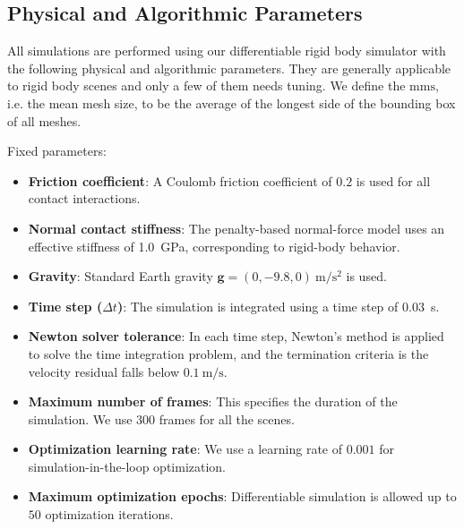 \subsection{Physical and Algorithmic Parameters}
All simulations are performed using our differentiable rigid body simulator with the following physical and algorithmic parameters. They are generally applicable to rigid body scenes and only a few of them needs tuning. We define the $\mathrm{mms}$, i.e. the mean mesh size, to be the average of the longest side of the bounding box of all meshes.

Fixed parameters:
\begin{itemize}

    \item \textbf{Friction coefficient}:  
    A Coulomb friction coefficient of $0.2$ is used for all contact interactions.

    \item \textbf{Normal contact stiffness}:  
    The penalty-based normal-force model uses an effective stiffness of 
    \SI{1.0}{\giga\pascal}, corresponding to rigid-body behavior.


    \item \textbf{Gravity}:  
    Standard Earth gravity $\mathbf{g} = (0, -9.8, 0)\ \si{\meter\per\second\squared}$ is used.

    \item \textbf{Time step ($\Delta t$)}:  
    The simulation is integrated using a time step of \SI{0.03}{\second}.


    \item \textbf{Newton solver tolerance}:  
    In each time step, Newton's method is applied to solve the time integration problem, and the termination criteria is the velocity residual falls below 
    $0.1\ \si{\meter\per\second}$.

    \item \textbf{Maximum number of frames}:  
    This specifies the duration of the simulation. We use 300 frames for all the scenes.

    \item \textbf{Optimization learning rate}:  
    We use a learning rate of $0.001$ for simulation-in-the-loop optimization.

    \item \textbf{Maximum optimization epochs}:  
    Differentiable simulation is allowed up to $50$ optimization iterations.
\end{itemize}

